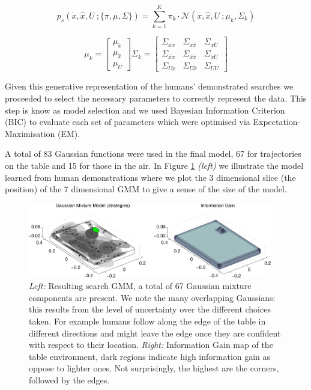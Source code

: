 \begin{equation} \label{eq:gmm2}
 p_s(\dot{x},\hat{x},U\: ; \{\pi,\mu,\Sigma\}) = \sum\limits_{k=1}^{K} \pi_{k} \cdot \mathcal{N}(\dot{x},\hat{x},U\: ;\mu_{k},\Sigma_{k} )
\end{equation}

\begin{equation*}
    \mu_{k} =
    \begin{bmatrix}
      \mu_{\dot{x}} \\
      \mu_{\hat{x}} \\
      \mu_{U}
    \end{bmatrix}
    \Sigma_{k} =
    \begin{bmatrix}
      \Sigma_{\dot{x}\dot{x}} & \Sigma_{\dot{x}\hat{x}} & \Sigma_{\dot{x}U} \\
      \Sigma_{\hat{x}\dot{x}} & \Sigma_{\hat{x}\hat{x}} & \Sigma_{\hat{x}U} \\
      \Sigma_{U\dot{x}} & \Sigma_{U\hat{x}} & \Sigma_{UU}   
    \end{bmatrix}
\end{equation*}

Given this generative representation of the humans' demonstrated searches we proceeded to 
select the necessary parameters to correctly represent the data. This step
is know as model selection and we used Bayesian Information Criterion (BIC) to evaluate
each set of parameters which were optimised via Expectation-Maximisation (EM). 

A total of 83 Gaussian functions were used in the final model, 67 for trajectories on the table and 15 for those in the air. In Figure
\ref{fig:gmm} \textit{(left)} we illustrate the model learned from human demonstrations where we plot the 3 dimensional slice (the position) of the 7
dimensional GMM to give a sense of the size of the model.

\begin{figure}
\centering
  \includegraphics[width=0.95\textwidth]{./ch3-Search/Figures/Figure4}
  \caption{\textit{Left: } Resulting search GMM, a total of 67 Gaussian mixture components are present. We note the many overlapping Gaussians: this results
from the level of uncertainty over the different choices taken. For example humans follow along the edge of the table in different directions and might
leave the edge once they are confident with respect to their location. \textit{Right:} Information Gain map of the table environment, dark regions indicate 
high information gain as oppose to lighter ones. Not surprisingly, the highest are the corners, followed by the edges.}
  \label{fig:gmm}
\end{figure}

